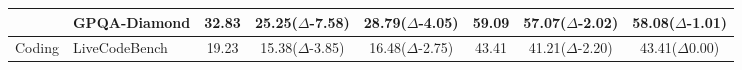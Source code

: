 \begin{table}[t!]
{\begin{tabular}{c l ccc ccc}
      & GPQA-Diamond
      & 32.83
      & \cellcolor{forgetDark}25.25\tiny{($\Delta$-7.58)}
      & \cellcolor{forgetLight}28.79\tiny{($\Delta$-4.05)}
      & 59.09
      & \cellcolor{forgetDark}57.07\tiny{($\Delta$-2.02)}
      & \cellcolor{forgetLight}58.08\tiny{($\Delta$-1.01)} \\
      \midrule
      \multirow{1}{*}{Coding} & 
      LiveCodeBench
      & 19.23
      & \cellcolor{forgetDark}15.38\tiny{($\Delta$-3.85)}
      & \cellcolor{forgetLight}16.48\tiny{($\Delta$-2.75)}
      & 43.41
      & \cellcolor{forgetDark}41.21\tiny{($\Delta$-2.20)}
      & 43.41\tiny{($\Delta$0.00)} \\
      \bottomrule
  \end{tabular}
    }
    \label{tbl:gen_other_bench}
\end{table}